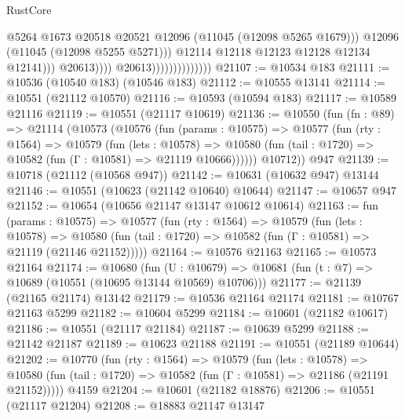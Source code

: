 \begin{lexlean}{RustCore}
\begin{coremodule}
                                                  @5264
                                                  @1673
                                                  @20518
                                                  @20521
                                                  @12096
                                                  (@11045 (@12098 @5265 @1679)))
                                                @12096
                                                (@11045 (@12098 @5255 @5271)))
                                              @12114
                                              @12118
                                              @12123
                                              @12128
                                              @12134
                                              @12141)))
                                        @20613))))
                                @20613))))))))))))))
@21107 := @10534 @183
@21111 := @10536 (@10540 @183) (@10546 @183)
@21112 := @10555 @13141
@21114 := @10551 (@21112 @10570)
@21116 := @10593 (@10594 @183)
@21117 := @10589 @21116
@21119 := @10551 (@21117 @10619)
@21136 := @10550
    (fun (fn : @89) =>
    @21114
      (@10573
        (@10576
          (fun (params : @10575) =>
          @10577
            (fun (rty : @1564) =>
            @10579
              (fun (lets : @10578) =>
              @10580 (fun (tail : @1720) => @10582 (fun (Γ : @10581) => @21119 @10666))))))
        @10712))
    @947
@21139 := @10718 (@21112 (@10568 @947))
@21142 := @10631 (@10632 @947) @13144
@21146 := @10551 (@10623 (@21142 @10640) @10644)
@21147 := @10657 @947
@21152 := @10654 (@10656 @21147 @13147 @10612 @10614)
@21163 := fun (params : @10575) =>
  @10577
    (fun (rty : @1564) =>
    @10579
      (fun (lets : @10578) =>
      @10580 (fun (tail : @1720) => @10582 (fun (Γ : @10581) => @21119 (@21146 @21152)))))
@21164 := @10576 @21163
@21165 := @10573 @21164
@21174 := @10680
    (fun (U : @10679) => @10681 (fun (t : @7) => @10689 (@10551 (@10695 @13144 @10569) @10706)))
@21177 := @21139 (@21165 @21174) @13142
@21179 := @10536 @21164 @21174
@21181 := @10767 @21163 @5299
@21182 := @10604 @5299
@21184 := @10601 (@21182 @10617)
@21186 := @10551 (@21117 @21184)
@21187 := @10639 @5299
@21188 := @21142 @21187
@21189 := @10623 @21188
@21191 := @10551 (@21189 @10644)
@21202 := @10770
    (fun (rty : @1564) =>
    @10579
      (fun (lets : @10578) =>
      @10580 (fun (tail : @1720) => @10582 (fun (Γ : @10581) => @21186 (@21191 @21152)))))
    @4159
@21204 := @10601 (@21182 @18876)
@21206 := @10551 (@21117 @21204)
@21208 := @18883 @21147 @13147

\end{coremodule}
\end{lexlean}
